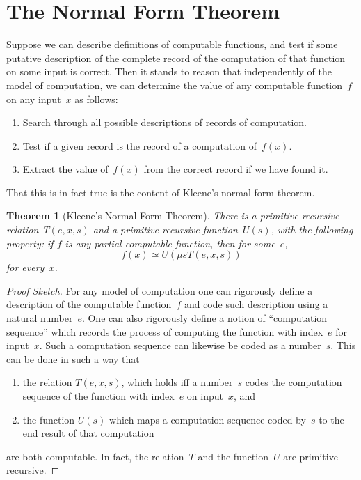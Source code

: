 \documentclass[10pt,a4paper]{article}
\theoremstyle{plain}
\newtheorem{thm}{Theorem}[section]
\theoremstyle{definition}
\theoremstyle{remark}
\newcommand*{\olfileid}[3]{}
\newcommand*{\olsection}[1]{\section*{#1}}
\newcommand*{\ollabel}[1]{\label{#1}}
\providecommand{\umin}{\mu}
\begin{document}



\olfileid{cmp}{thy}{nfm}
\olsection{The Normal Form Theorem}

Suppose we can describe definitions of computable functions, and test if
some putative description of the complete record of the computation of
that function on some input is correct. Then it stands to reason that
independently of the model of computation, we can determine the value
of any computable function~$f$ on any input~$x$ as follows:
\begin{enumerate}
  \item Search through all possible descriptions of records of
  computation.
  \item Test if a given record is the record of a computation of~$f(x)$.
  \item Extract the value of~$f(x)$ from the correct record if we have
  found it.
\end{enumerate}
That this is in fact true is the content of Kleene's normal form
theorem.

\begin{thm}[Kleene's Normal Form Theorem]
\ollabel{thm:normal-form}
There is a primitive recursive relation~$T(e, x, s)$ and a primitive
recursive function~$U(s)$, with the following property: if $f$ is any
partial computable function, then for some~$e$,
\[
f(x) \simeq U(\umin{s}{T(e, x, s)})
\]
for every~$x$.
\end{thm}

\begin{proof}[Proof Sketch]
For any model of computation one can rigorously define a description
of the computable function~$f$ and code such description using a
natural number~$e$.  One can also rigorously define a notion of
``computation sequence'' which records the process of computing the
function with index~$e$ for input~$x$.  Such a computation sequence can
likewise be coded as a number~$s$.  This can be done in such a way
that
\begin{enumerate}
  \item the relation $T(e, x, s)$, which holds iff a number~$s$ codes the computation
  sequence of the function with index~$e$ on input~$x$, and
  \item the function $U(s)$ which maps a computation sequence coded
  by~$s$ to the end result of that computation
\end{enumerate}
are both computable. In fact, the relation~$T$ and the function~$U$
are primitive recursive.
\end{proof}
\end{document}
